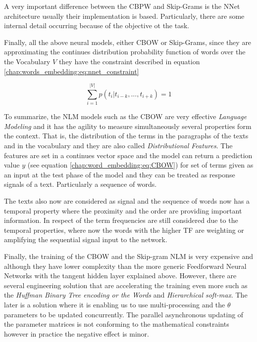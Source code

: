 A very important difference between the CBPW and Skip-Grams is the NNet architecture usually their implementation is based. Particularly, there are some internal detail occurring because of the objective ot the task. \parencite{boden2002guide}

Finally, all the above neural models, either CBOW or Skip-Grams, since they are approximating the continues distribution probability function of words over the the Vocabulary $V$ they have the constraint described in equation \ref{chap:words_embedding:eq:nnet_constraint}

\begin{equation} \label{chap:word_embedding:eq:nnet_condtraint}
	\sum_{i=1}^{|V|}{p(t_{i}|t_{i-k}, ... ,t_{i+k})} = 1
\end{equation}

To summarize, the NLM models such as the CBOW are very effective \textit{Language Modeling} and it has the agility to measure simultaneously several properties form the context. That is, the distribution of the terms in the paragraphs of the texts and in the vocabulary and they are also called \textit{Distributional Features}. The features are set in a continues vector space and the model can return a prediction value $y$ (see equation \ref{chap:word_embedding:eq:CBOW}) for set of terms given as an input at the test phase of the model and they can be treated as response signals of a text. Particularly a sequence of words.

The texts also now are considered as signal and the sequence of words now has a temporal property where the proximity and the order are providing important information. In respect of the term frequencies are still considered due to the temporal properties, where now the words with the higher TF are weighting or amplifying the sequential signal input to the network.

Finally, the training of the CBOW and the Skip-gram NLM is very expensive and although they have lower complexity than the more generic Feedforward Neural Networks with the tangent hidden layer explained above. However, there are several engineering solution that are accelerating the training even more such as the \textit{Huffman Binary Tree encoding or the Words} and \textit{Hierarchical soft-max}. The later is a solution where it is enabling us to use multi-processing and the $\theta$ parameters to be updated concurrently. The parallel asynchronous updating of the parameter matrices is not conforming to the mathematical constraints however in practice the negative effect is minor. 

